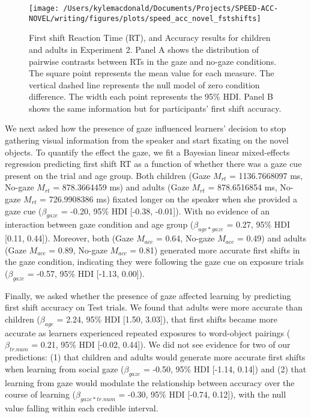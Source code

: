 \documentclass[10pt, letterpaper]{article}
\newenvironment{CodeChunk}{}{}
\begin{document}
\begin{CodeChunk}
\begin{figure}[t]

{\centering \texttt{[image: /Users/kylemacdonald/Documents/Projects/SPEED-ACC-NOVEL/writing/figures/plots/speed\_acc\_novel\_fstshifts]} 

}

\caption[First shift Reaction Time (RT), and Accuracy results for children and adults in Experiment 2]{First shift Reaction Time (RT), and Accuracy results for children and adults in Experiment 2. Panel A shows the distribution of pairwise contrasts between RTs in the gaze and no-gaze conditions. The square point represents the mean value for each measure. The vertical dashed line represents the null model of zero condition difference. The width each point represents the 95\% HDI. Panel B shows the same information but for participants' first shift accuracy.}\label{fig:speed-acc-novel-shifts}
\end{figure}
\end{CodeChunk}

We next asked how the presence of gaze influenced learners' decision to
stop gathering visual information from the speaker and start fixating on
the novel objects. To quantify the effect the gaze, we fit a Bayesian
linear mixed-effects regression predicting first shift RT as a function
of whether there was a gaze cue present on the trial and age group. Both
children (Gaze \(M_{rt}\) = 1136.7668097 ms, No-gaze \(M_{rt}\) =
878.3664459 ms) and adults (Gaze \(M_{rt}\) = 878.6516854 ms, No-gaze
\(M_{rt}\) = 726.9908386 ms) fixated longer on the speaker when she
provided a gaze cue (\(\beta_{gaze}\) = -0.20, 95\% HDI {[}-0.38,
-0.01{]}). With no evidence of an interaction between gaze condition and
age group (\(\beta_{age*gaze}\) = 0.27, 95\% HDI {[}0.11, 0.44{]}).
Moreover, both (Gaze \(M_{acc}\) = 0.64, No-gaze \(M_{acc}\) = 0.49) and
adults (Gaze \(M_{acc}\) = 0.89, No-gaze \(M_{acc}\) = 0.81) generated
more accurate first shifts in the gaze condition, indicating they were
following the gaze cue on exposure trials (\(\beta_{gaze}\) = -0.57,
95\% HDI {[}-1.13, 0.00{]}).

Finally, we asked whether the presence of gaze affected learning by
predicting first shift accuracy on Test trials. We found that adults
were more accurate than children (\(\beta_{age}\) = 2.24, 95\% HDI
{[}1.50, 3.03{]}), that first shifts became more accurate as learners
experienced repeated exposures to word-object pairings
(\(\beta_{tr.num}\) = 0.21, 95\% HDI {[}-0.02, 0.44{]}). We did not see
evidence for two of our predictions: (1) that children and adults would
generate more accurate first shifts when learning from social gaze
(\(\beta_{gaze}\) = -0.50, 95\% HDI {[}-1.14, 0.14{]}) and (2) that
learning from gaze would modulate the relationship between accuracy over
the course of learning (\(\beta_{gaze*tr.num}\) = -0.30, 95\% HDI
{[}-0.74, 0.12{]}), with the null value falling within each credible
interval.
\end{document}
